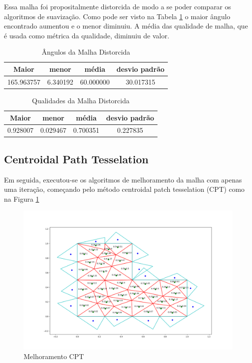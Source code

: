 Essa malha foi propositalmente distorcida de modo a se poder comparar os algoritmos de suavização. Como pode ser visto na Tabela \ref{tab:angulos-malha-distorcida} o maior ângulo encontrado aumentou e o menor diminuiu. A média das qualidade de malha, que é usada como métrica da qualidade, diminuiu de valor.

\begin{table}[hb]
\centering
\par\caption{Ângulos da Malha Distorcida}
\begin{tabular}{c|c|c|c}
Maior&menor&média&desvio padrão\\\hline\hline
165.963757&6.340192&60.000000&30.017315\\\hline
\end{tabular}
\label{tab:angulos-malha-distorcida}
\end{table}



\begin{table}[hb]
\centering
\par\caption{Qualidades da Malha Distorcida}
\begin{tabular}{c|c|c|c}
Maior&menor&média&desvio padrão\\\hline\hline
0.928007&0.029467&0.700351&0.227835\\\hline
\end{tabular}
\label{tab:qualidades-malha-distorcida}
\end{table}

\newpage
\subsection{Centroidal Path Tesselation}

Em seguida, executou-se os algoritmos de melhoramento da malha com apenas uma iteração, começando pelo método centroidal patch tesselation (CPT) como na Figura \ref{fig:malha-cpt}

\begin{figure}[ht]
    \centering
    \includegraphics[width=1\linewidth]{fig/malha-cpt.png}
    \caption{Melhoramento CPT}
    \label{fig:malha-cpt}
\end{figure}

